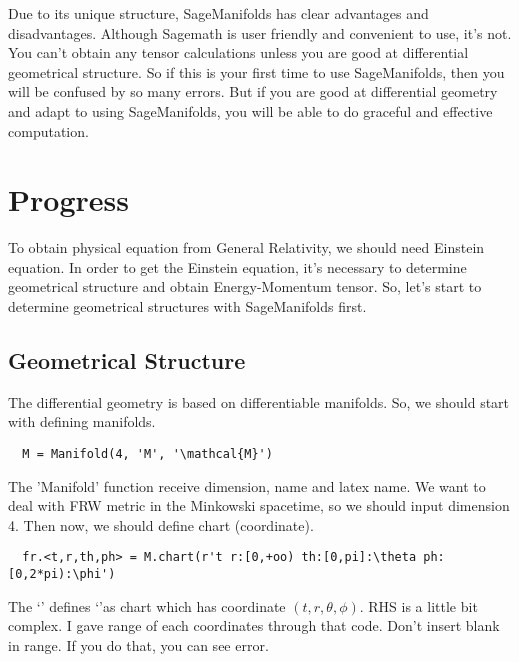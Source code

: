 \documentclass[%
 reprint,
 amsmath,amssymb,
 aps,
]{revtex4-1}
\begin{document}
Due to its unique structure, SageManifolds has clear advantages and
disadvantages.
Although Sagemath is user friendly and convenient to use, it's not. You can't
obtain any tensor calculations unless you are good at differential geometrical
structure. So if this is your first time to use SageManifolds, then you will be
confused by so many errors. But if you are good at differential geometry and
adapt to using SageManifolds, you will be able to do graceful and effective
computation.

\section{Progress}

To obtain physical equation from General Relativity, we should need Einstein
equation. In order to get the Einstein equation, it's necessary to determine
geometrical structure and obtain Energy-Momentum tensor. So, let's start to
determine geometrical structures with SageManifolds first.

\subsection{Geometrical Structure}

The differential geometry is based on differentiable manifolds. So, we should
start with defining manifolds.
\begin{lstlisting}
  M = Manifold(4, 'M', '\mathcal{M}')
\end{lstlisting}
The '{\ttfamily Manifold}' function receive dimension, name and latex name. We
want to deal with FRW metric in the Minkowski spacetime, so we should input
dimension 4. Then now, we should define chart (coordinate).
\begin{lstlisting}
  fr.<t,r,th,ph> = M.chart(r't r:[0,+oo) th:[0,pi]:\theta ph:[0,2*pi):\phi')
\end{lstlisting}
The `' defines `'as chart which has coordinate
$(t,r,\theta,\phi)$. RHS is a little bit complex. I gave range of each
coordinates through that code. Don't insert blank in range. If you do that, you
can see error.
\end{document}

